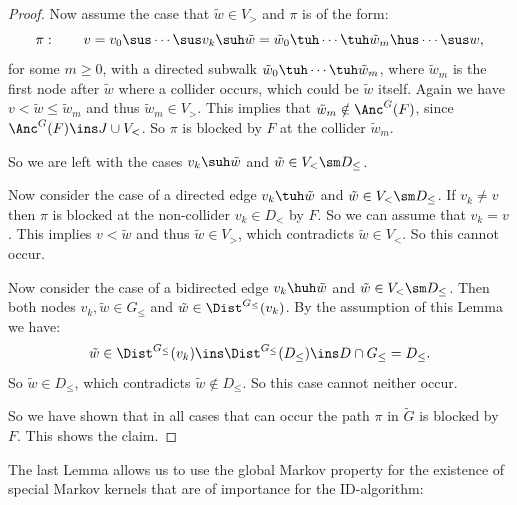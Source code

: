 \begin{Lem}
\begin{proof}
       Now assume the case that $\tilde w \in V_>$ and $\pi$ is of the form:
        \[\pi:\qquad v=v_0 \sus \cdots \sus v_k \suh \tilde w = \tilde w_0 \tuh  \cdots  \tuh \tilde w_m \hus \cdots  \sus w, \]
        for some $m \ge 0$, with a directed subwalk $\tilde w_0 \tuh  \cdots  \tuh \tilde w_m$, where $\tilde w_m$ is the first node after $\tilde w$ where a collider occurs, which could be $\tilde w$ itself. Again we have $v < \tilde w \le \tilde w_m$ and thus 
        $\tilde w_m \in V_>$. This implies that $\tilde w_m \notin \Anc^G(F)$, since $\Anc^G(F) \ins J \cup V_<$. 
        So $\pi$ is blocked by $F$ at the collider $\tilde w_m$.

       So we are left with the cases $v_k \suh \tilde w$ and $\tilde w \in V_<\sm D_\le$.
 
       Now consider the case of a directed edge $v_k \tuh \tilde w$ and $\tilde w \in V_<\sm D_\le$.
       If $v_k \neq v$ then $\pi$ is blocked at the non-collider $v_k \in D_<$ by $F$. 
       So we can assume that $v_k=v$. This implies $v < \tilde w$ and thus $\tilde w \in V_>$, which contradicts $\tilde w \in V_<$.
       So this cannot occur.

       Now consider the case of a bidirected edge $v_k \huh \tilde w$ and $\tilde w \in V_< \sm D_\le$.
       Then both nodes $v_k,\tilde w \in G_\le$ and $\tilde w \in \Dist^{G_\le}(v_k)$. By the assumption of this Lemma we have:
       \[ \tilde w \in \Dist^{G_\le}(v_k) \ins \Dist^{G_\le}(D_\le) \ins D \cap G_\le = D_\le. \]
       So $\tilde w \in D_\le$, which contradicts $\tilde w \notin D_\le$. So this case cannot neither occur.

       So we have shown that in all cases that can occur the path $\pi$ in $\tilde G$ is blocked by $F$. This shows the claim.
   \end{proof}
\end{Lem}




The last Lemma allows us to use the global Markov property for the existence of special Markov kernels that are of importance for the ID-algorithm:


